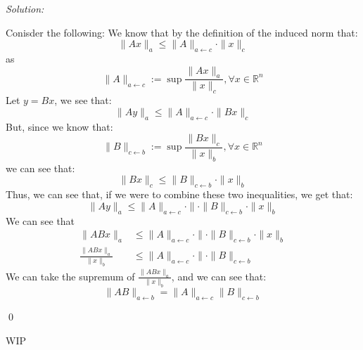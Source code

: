 \documentclass[12pt]{article}
\newenvironment{problem}[2][Problem]{\begin{trivlist}
\item[\hskip \labelsep {\bfseries #1}\hskip \labelsep {\bfseries #2.}]}{\end{trivlist}}
\newenvironment{sol}
    {\emph{Solution:}
    }
    {
    \qed
    }
\newcommand{\R}{\mathbb{R}}
\begin{document}
\begin{problem}{4}
    
\end{problem}
\begin{sol}
    Conisder the following: We know that by the definition of the induced norm that:
    \[
    \|Ax\|_a \leq \| A\|_{a \leftarrow c} \cdot \|x\|_c
    \]
    as 
    \[
    \|A\|_{a \leftarrow c} := \sup \frac{\|Ax\|_a}{\|x\|_c}, \forall x \in \R^n
    \]
    Let $y = Bx$, we see that:
    \[
    \|Ay\|_a \leq \|A\|_{a\leftarrow c} \cdot  \|Bx\|_c
    \]
    But, since we know that:
    \[
    \|B\|_{c \leftarrow b} := \sup \frac{\|Bx\|_c}{\|x\|_b}, \forall x \in \R^n
    \]
    we can see that:
    \[
        \|Bx\|_c \leq \| B\|_{c \leftarrow b} \cdot \|x\|_b
    \]
    Thus, we can see that, if we were to combine these two inequalities, we get that:
    \[
        \|Ay\|_{a} \leq \|A\|_{a\leftarrow c} \cdot \|\cdot \| B\|_{c \leftarrow b} \cdot \|x\|_b
    \]
    We can see that 
    \begin{align*}
        \|ABx\|_{a} & \leq \|A\|_{a\leftarrow c} \cdot \|\cdot \| B\|_{c \leftarrow b} \cdot \|x\|_b\\
        \frac{\|ABx\|_{a}}{\|x\|_b} & \leq \|A\|_{a\leftarrow c} \cdot \|\cdot \| B\|_{c \leftarrow b}
    \end{align*}
    We can take the supremum of $\frac{\|ABx\|_{a}}{\|x\|_b}$, and we can see that:
    \[
    \|AB\|_{a \leftarrow b} = \|A\|_{a \leftarrow c} \|B\|_{c \leftarrow b}
    \]
\end{sol}

\begin{problem}{5}
    WIP
\end{problem}
\end{document}
